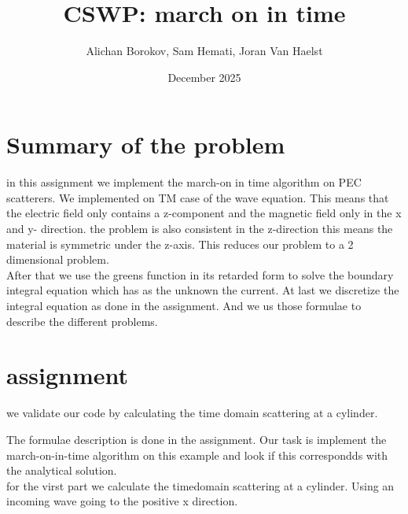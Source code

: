 \documentclass{article}
\title{CSWP: march on in time}
\author{Alichan Borokov, Sam Hemati, Joran Van Haelst}
\date{December 2025}
\begin{document}
\maketitle

\section{Summary of the problem}
in this assignment we implement the march-on in time algorithm on PEC scatterers.
We implemented  on TM case of the wave equation. This means that the electric field only contains a z-component and the magnetic field only in the x and y- direction.
the problem is also consistent in the z-direction this means the material is symmetric under the z-axis.
This reduces our problem to a 2 dimensional problem.\\

After  that we use the greens function in its retarded form to solve the boundary integral equation which has as the unknown the current.
At last we discretize the integral equation as done in the assignment. And we us those formulae to describe the different problems.


\section{assignment}
we validate our code by calculating the time domain scattering at a cylinder.

The formulae description is done  in the assignment. Our task is  implement the march-on-in-time algorithm on this example and look if this correspondds with the analytical solution.
\\

for the virst part we calculate the timedomain scattering at a cylinder. Using an incoming wave going to the positive x direction.
\end{document}
